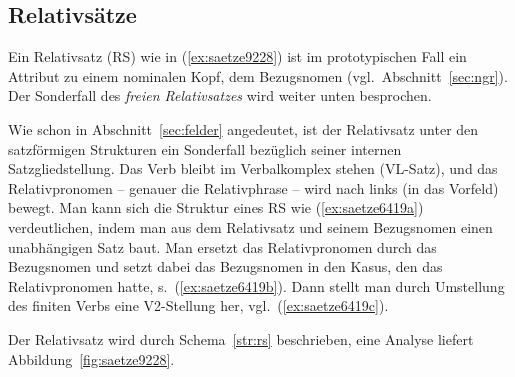 \subsection{Relativsätze}

\label{sec:relativsaetze}

Ein Relativsatz (RS) wie in (\ref{ex:saetze9228}) ist im prototypischen Fall ein Attribut zu einem nominalen Kopf, dem Bezugsnomen (vgl.\ Abschnitt~\ref{sec:ngr}).
Der Sonderfall des \textit{freien Relativsatzes} wird weiter unten besprochen.

\begin{exe}
\end{exe}

Wie schon in Abschnitt~\ref{sec:felder} angedeutet, ist der Relativsatz unter den satzförmigen Strukturen ein Sonderfall bezüglich seiner internen Satzgliedstellung.
Das Verb bleibt im Verbalkomplex stehen (VL-Satz), und das Relativpronomen -- genauer die Relativphrase -- wird nach links (in das Vorfeld) bewegt.
Man kann sich die Struktur eines RS wie (\ref{ex:saetze6419a}) verdeutlichen, indem man aus dem Relativsatz und seinem Bezugsnomen einen unabhängigen Satz baut.
Man ersetzt das Relativpronomen durch das Bezugsnomen und setzt dabei das Bezugsnomen in den Kasus, den das Relativpronomen hatte, s.\ (\ref{ex:saetze6419b}). 
Dann stellt man durch Umstellung des finiten Verbs eine V2-Stellung her, vgl.\ (\ref{ex:saetze6419c}).

\begin{exe}
  \ex\label{ex:saetze6419}
  \begin{xlist}
  \end{xlist}
\end{exe}

Der Relativsatz wird durch Schema~\ref{str:rs} beschrieben, eine Analyse liefert Abbildung~\ref{fig:saetze9228}.



